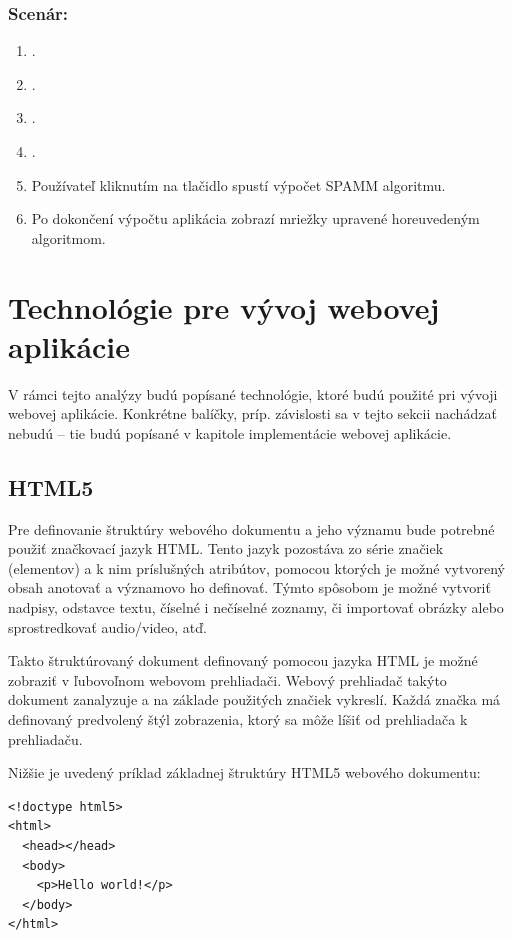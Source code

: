 \subsubsection*{Scenár:}
\begin {enumerate}
\item {}.
\item {}.
\item {}.
\item {}.
\item {Používateľ kliknutím na tlačidlo  spustí výpočet SPAMM algoritmu.}
\item {Po dokončení výpočtu aplikácia zobrazí mriežky upravené horeuvedeným algoritmom.}
\end {enumerate}

\section {Technológie pre vývoj webovej aplikácie}
V rámci tejto analýzy budú popísané technológie, ktoré budú použité pri vývoji webovej aplikácie. Konkrétne balíčky, príp. závislosti sa v tejto sekcii nachádzať nebudú -- tie budú popísané v kapitole implementácie webovej aplikácie.

\subsection {HTML5}
Pre definovanie štruktúry webového dokumentu a jeho významu bude potrebné použiť značkovací jazyk HTML. Tento jazyk pozostáva zo série značiek (elementov) a k nim príslušných atribútov, pomocou ktorých je možné vytvorený obsah anotovať a významovo ho definovať. Týmto spôsobom je možné vytvoriť nadpisy, odstavce textu, číselné i nečíselné zoznamy, či importovať obrázky alebo sprostredkovať audio/video, atď.

Takto štruktúrovaný dokument definovaný pomocou jazyka HTML je možné zobraziť v ľubovoľnom webovom prehliadači. Webový prehliadač takýto dokument zanalyzuje a na základe použitých značiek vykreslí. Každá značka má definovaný predvolený štýl zobrazenia, ktorý sa môže líšiť od prehliadača k prehliadaču.

\clearpage

Nižšie je uvedený príklad základnej štruktúry HTML5 webového dokumentu:

\begin{minipage}[]{\linewidth}
\begin{verbatim}
<!doctype html5>
<html>
  <head></head>
  <body>
    <p>Hello world!</p>
  </body>
</html>
\end{verbatim}
\end{minipage}

